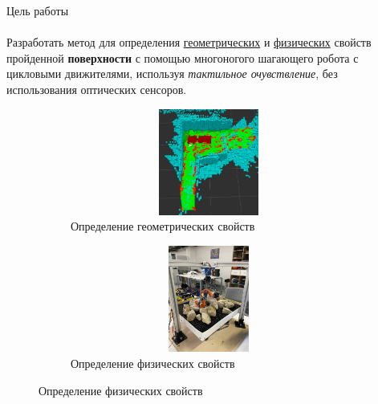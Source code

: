 \documentclass[aspectratio=169,xcolor=table]{beamer}
\begin{document}
\begin{frame}[t]{Цель работы}
    \framesubtitle{}
    \vspace{-0.4cm}
    Разработать метод для определения \underline{геометрических} и \underline{физических} свойств пройденной \textbf{поверхности} с помощью многоногого шагающего робота с цикловыми движителями, используя \textit{тактильное очувствление}, без использования оптических сенсоров.
    \begin{figure}[H]
        \begin{subfigure}{0.49\textwidth}
            \centering\includegraphics[height=3.5cm,width=1\textwidth,keepaspectratio]{conv_concave.png}
            \caption*{Определение геометрических свойств}
        \end{subfigure}
        \begin{subfigure}{0.49\textwidth}
            \centering\includegraphics[height=3.5cm,width=1\textwidth,keepaspectratio]{s_shape_leg/view.jpg}
            \caption*{Определение физических свойств}
            \label{fig:s_shape_leg/view.jpg}
        \end{subfigure}
    \end{figure}
\end{frame}
\end{document}

